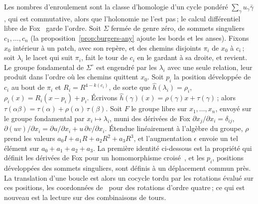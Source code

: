 \documentclass[11pt,a4paper]{article}
\begin{document}
Les nombres d'enroulement sont la classe d'homologie d'un cycle pondéré
$\sum_\gamma u_\gamma \bar\gamma$, qui est commutative, alors que l'holonomie
ne l'est pas\,; le calcul différentiel libre de Fox~\cite{fox1953free} garde
l'ordre. Soit $\Sigma$ fermée de genre zéro, de sommets singuliers $c_1,
\dots, c_n$ (la proposition~\ref{prop:burgers-any} ajoute les bords et les
anses). Fixons $x_0$ intérieur à un patch, avec son repère, et des chemins
disjoints $\pi_i$ de $x_0$ à $c_i$\,; soit $\lambda_i$ le lacet qui suit
$\pi_i$, fait le tour de $c_i$ en le gardant à sa droite, et revient. Le
groupe fondamental de $\Sigma^\circ$ est engendré par les $\lambda_i$ avec une
seule relation, leur produit dans l'ordre où les chemins quittent $x_0$. Soit
$p_i$ la position développée de $c_i$ au bout de $\pi_i$ et $R_i = R^{4 -
k(c_i)}$, de sorte que $\hat h(\lambda_i) = \rho_i$, $\rho_i(x) = R_i(x - p_i)
+ p_i$. Écrivons $\hat h(\gamma)(x) = \rho(\gamma)x + \tau(\gamma)$\,; alors
$\tau(\alpha\beta) = \tau(\alpha) + \rho(\alpha)\,\tau(\beta)$. Soit $F$ le
groupe libre sur $x_1, \dots, x_n$, envoyé sur le groupe fondamental par $x_i
\mapsto \lambda_i$, muni des dérivées de Fox $\partial x_j/\partial x_i =
\delta_{ij}$, $\partial(uv)/\partial x_i = \partial u/\partial x_i +
u\,\partial v/\partial x_i$. Étendue linéairement à l'algèbre du groupe,
$\rho$ prend les valeurs $a_0 I + a_1 R + a_2 R^2 + a_3 R^3$, et
l'augmentation $\epsilon$ envoie un tel élément sur $a_0 + a_1 + a_2 + a_3$.
La première identité ci-dessous est la propriété qui définit les dérivées de
Fox pour un homomorphisme croisé~\cite{fox1953free}, et les $p_i$, positions
développées des sommets singuliers, sont définis à un déplacement commun
près. La translation d'une boucle est alors un cocycle tordu par les
rotations évalué sur ces positions, les coordonnées
de~\cite{thurston1998shapes} pour des rotations d'ordre quatre\,; ce qui est
nouveau est la lecture sur des combinaisons de tours.
\end{document}
